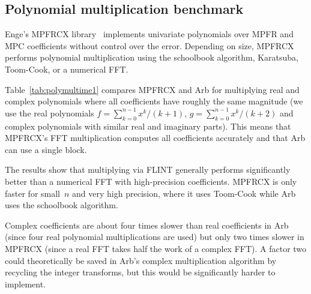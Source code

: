 \documentclass[10pt,journal,compsoc,cspaper]{IEEEtran}
\begin{document}
\subsection{Polynomial multiplication benchmark}

Enge's MPFRCX library~\cite{engempfrcx} implements
univariate
polynomials over MPFR and MPC coefficients
without control over the error.
Depending on size, MPFRCX performs
polynomial multiplication using
the schoolbook algorithm,
Karatsuba, Toom-Cook, or a numerical FFT.

Table~\ref{tab:polymultime1} compares MPFRCX and Arb
for multiplying real and complex polynomials
where all coefficients have roughly the same magnitude
(we use the real polynomials $f = \sum_{k=0}^{n-1} x^k / (k+1)$,
$g = \sum_{k=0}^{n-1} x^k / (k+2)$ and complex polynomials
with similar real and imaginary parts).
This means that MPFRCX's FFT multiplication
computes all coefficients accurately and that
Arb can use a single block.

The results show that multiplying via FLINT
generally performs significantly
better than a numerical FFT with high-precision coefficients.
MPFRCX is only faster for small~$n$ and very high precision,
where it uses Toom-Cook while Arb uses the schoolbook algorithm.

Complex coefficients are about four times slower than real
coefficients in Arb (since four real polynomial multiplications are used)
but only two times slower in MPFRCX (since a real FFT
takes half the work of a complex FFT).
A factor two could theoretically be saved in Arb's complex
multiplication algorithm
by recycling the integer transforms, but this would
be significantly harder to implement.
\end{document}
